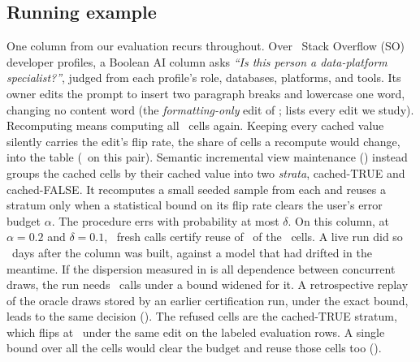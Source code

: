 \keepheading
\subsection{Running example}
One column from our evaluation recurs
throughout. Over \corpusSO\ Stack Overflow (SO) developer profiles, a
Boolean AI column asks \emph{``Is this person a data-platform
specialist?''}, judged from each profile's role, databases, platforms,
and tools. Its owner edits the prompt to insert two paragraph breaks
and lowercase one word, changing no content word (the
\emph{formatting-only} edit of ;
 lists every edit we study). Recomputing means
computing all \corpusSO\ cells again. Keeping every cached value
silently carries the edit's flip rate, the share of cells a recompute
would change, into the table (\flipSoFormatting\ on this pair).
Semantic incremental view maintenance (\sivm{}) instead groups the
cached cells by their cached value into two \emph{strata}, cached-TRUE
and cached-FALSE. It recomputes a small seeded sample from each and
reuses a stratum only when a statistical bound on its flip rate clears
the user's error budget $\alpha$. The procedure
errs with probability at most $\delta$. On this column, at $\alpha{=}0.2$ and
$\delta{=}0.1$, \deployOracle\ fresh calls certify reuse of
\deployReused\ of the \deployN\ cells. A live run did so
\driftDaysLater\ days after the column was built, against a model that
had drifted in the meantime. If the dispersion measured in
 is all dependence between concurrent draws, the run
needs \widenSepLooseCallsEst\ calls under a bound widened for it. A retrospective replay of
the oracle draws stored by an earlier certification run, under the exact
bound, leads to the same decision (). The refused cells
are the cached-TRUE stratum, which flips at \minoritySingle\
under the same edit on the labeled evaluation rows. A single bound over
all the cells would clear the budget and reuse those cells too
().

\keepheading
